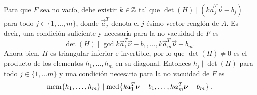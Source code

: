 \begin{observation}
	Para que $F$ sea no vacío, debe existir $k \in \mathbb{Z}$ tal que $\det(H) \mid (k\vec{a}_j^T
	\vec{\nu} - b_j)$ para todo $j \in \lbrace 1, \ldots, m \rbrace$, donde $\vec{a}^T_j$
	denota el $j$-ésimo vector renglón de $A$. Es decir, una condición suficiente y necesaria para
	la no vacuidad de $F$ es
	\begin{equation*}
		\det(H) \mid \gcd{k\vec{a}_1^T\vec{\nu} - b_1, \ldots, k\vec{a}_m^T\vec{\nu} - b_m}.
	\end{equation*}
	Ahora bien, $H$ es triangular inferior e invertible, por lo que $\det(H) \neq 0$ es el producto
	de los elementos $h_1, \ldots, h_m$ en su diagonal. Entonces $h_j \mid \det(H)$ para todo $j \in
	\lbrace 1, \ldots m \rbrace$ y una condición necesaria para la no vacuidad de $F$ es
	\begin{equation*}
		\mathop{\mathrm{mcm}{\left\lbrace h_1, \ldots, h_m \right\rbrace}} \mid \mathop{\mathrm{mcd}{\left\lbrace k\boldsymbol{a}_1^T\boldsymbol{\nu} - b_1, \ldots, k\boldsymbol{a}_m^T\boldsymbol{\nu} - b_m \right\rbrace}}.
	\end{equation*}
\end{observation}

